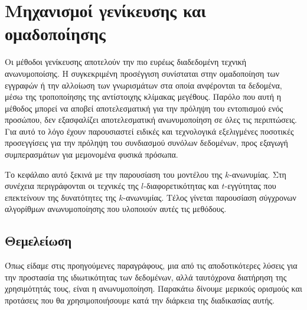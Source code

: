 \chapter{Μηχανισμοί γενίκευσης και ομαδοποίησης}

Οι μέθοδοι γενίκευσης αποτελούν την πιο ευρέως διαδεδομένη τεχνική ανωνυμοποίσης. Η συγκεκριμένη προσέγγιση συνίσταται στην ομαδοποίηση των εγγραφών ή την αλλοίωση των γνωρισμάτων στα οποία ανφέρονται τα δεδομένα, μέσω της τροποποίησης της αντίστοιχης κλίμακας μεγέθους. Παρόλο που αυτή η μέθοδος μπορεί να αποβεί αποτελεσματική για την πρόληψη του εντοπισμού ενός προσώπου, δεν εξασφαλίζει αποτελεσματική ανωνυμοποίηση σε όλες τις περιπτώσεις. Για αυτό το λόγο έχουν παρουσιαστεί ειδικές και τεχνολογικά εξελιγμένες ποσοτικές προσεγγίσεις για την πρόληψη του συνδιασμού συνόλων δεδομένων, προς εξαγωγή συμπερασμάτων για μεμονομένα φυσικά πρόσωπα. 

Το κεφάλαιο αυτό ξεκινά με την παρουσίαση  του μοντέλου της $k$-ανωνυμίας. Στη συνέχεια περιγράφονται οι τεχνικές της $l$-διαφορετικότητας και $t$-εγγύτητας που επεκτείνουν της δυνατότητες της $k$-ανωνυμίας. Τέλος γίνεται  παρουσίαση σύγχρονων αλγορίθμων ανωνυμοποίησης που υλοποιούν αυτές τις μεθόδους.

\section{Θεμελείωση}

Όπως είδαμε στις προηγούμενες παραγράφους, μια από τις αποδοτικότερες λύσεις για την προστασία της ιδιωτικότητας των δεδομένων, αλλά ταυτόχρονα διατήρηση της χρησιμότητάς τους, είναι η ανωνυμοποίηση. Παρακάτω δίνουμε μερικούς ορισμούς και προτάσεις που θα χρησιμοποιήσουμε κατά την διάρκεια της διαδικασίας αυτής.

